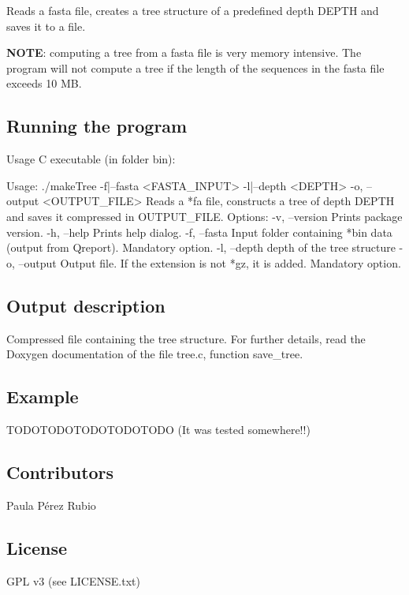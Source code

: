 Reads a {\ttfamily fasta} file, creates a tree structure of a predefined depth {\ttfamily D\+E\+P\+TH} and saves it to a file.

{\bfseries N\+O\+TE}\+: computing a tree from a fasta file is very memory intensive. The program will not compute a tree if the length of the sequences in the fasta file exceeds 10 MB.

\subsection*{Running the program}

Usage {\ttfamily C} executable (in folder {\ttfamily bin})\+:


\begin{DoxyCode}
Usage: ./makeTree -f|--fasta <FASTA\_INPUT> -l|--depth <DEPTH> 
-o, --output <OUTPUT\_FILE> Reads a *fa file, constructs a tree of 
depth DEPTH and saves it compressed in OUTPUT\_FILE.
Options: 
 -v, --version Prints package version.
 -h, --help    Prints help dialog.
 -f, --fasta   Input folder containing *bin data (output from Qreport). Mandatory option.
 -l, --depth depth of the tree structure
 -o, --output Output file. If the extension is not *gz, it is added. Mandatory option.
\end{DoxyCode}


\subsection*{Output description}

Compressed file containing the tree structure. For further details, read the {\ttfamily Doxygen} documentation of the file {\ttfamily tree.\+c}, function {\ttfamily save\+\_\+tree}.

\subsection*{Example}

T\+O\+D\+O\+T\+O\+D\+O\+T\+O\+D\+O\+T\+O\+D\+O\+T\+O\+DO (It was tested somewhere!!)

\subsection*{Contributors}

Paula Pérez Rubio

\subsection*{License}

G\+PL v3 (see L\+I\+C\+E\+N\+S\+E.\+txt) 